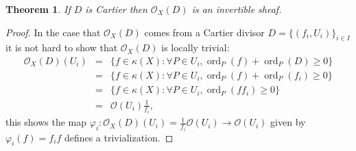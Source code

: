 \documentclass[12pt]{article}
\numberwithin{equation}{section}
\newtheorem{theorem}{Theorem}[subsection]
\theoremstyle{definition}
\theoremstyle{remark}
\newcommand{\Ocal}{\mathcal{O}}
\newcommand{\ord}{\operatorname{ord}}
\begin{document}
\begin{theorem}\label{theorem:cartier-to-invertible}
	If $D$ is Cartier then $\Ocal_X(D)$ is an invertible sheaf.
\end{theorem}
\begin{proof}
	In the case that $\Ocal_X(D)$ comes from a Cartier divisor $D = \lbrace (f_i,U_i) \rbrace_{i\in I}$ it is not hard to show that $\Ocal_X(D)$ is locally trivial:
	\begin{eqnarray*}
		\Ocal_X(D)(U_i) &=& \lbrace f\in \kappa(X) : \forall P\in U_i, \ord_P(f) + \ord_P(D) \geq 0 \rbrace \\
		&=& \lbrace f\in \kappa(X) : \forall P\in U_i, \ord_P(f) + \ord_P(f_i) \geq 0 \rbrace \\
		&=& \lbrace f\in \kappa(X) : \forall P\in U_i, \ord_P(ff_i)\geq 0 \rbrace\\
		&=& \mathcal O(U_i)\frac{1}{f_i},
	\end{eqnarray*}
	this shows the map $\varphi_i:\Ocal_X(D)(U_i) = \frac{1}{f_i}\mathcal O(U_i) \to \mathcal O(U_i)$ given by $ \varphi_i(f) = f_i f$ defines a trivialization.
\end{proof}
\end{document}
